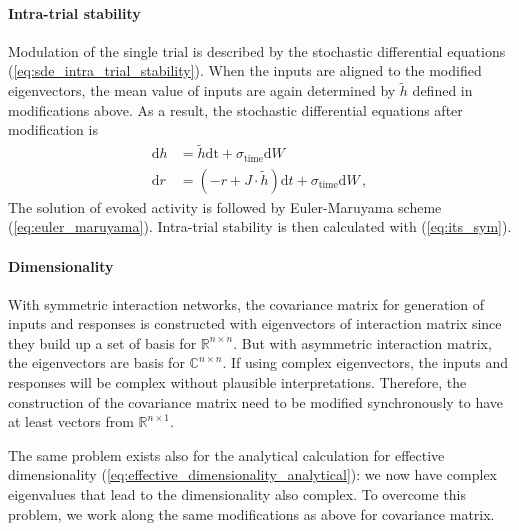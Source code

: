 \documentclass[11pt]{article}
\begin{document}
	\paragraph{Intra-trial stability} Modulation of the single trial is described by the stochastic differential equations (\ref{eq:sde_intra_trial_stability}). When the inputs are aligned to the modified eigenvectors, the mean value of inputs are again determined by $\tilde{h}$ defined in modifications above. As a result, the stochastic differential equations after modification is 
		\begin{subequations}
			\begin{align}
				\mathrm{d} h & = \tilde{h} \mathrm{dt} + \sigma_{\text{time}} \mathrm{d} W \\
				\mathrm{d} r & = (-r + J \cdot \tilde{h}) \mathrm{d}t + \sigma_{\text{time}} \mathrm{d} W \, ,
			\end{align}
		\end{subequations}
	The solution of evoked activity is followed by Euler-Maruyama scheme (\ref{eq:euler_maruyama}). Intra-trial stability is then calculated with (\ref{eq:its_sym}). 
	
	\paragraph{Dimensionality}%
	With symmetric interaction networks, the covariance matrix for generation of inputs and responses is constructed with eigenvectors of interaction matrix since they build up a set of basis for $\mathbb{R}^{n \times n}$. But with asymmetric interaction matrix, the eigenvectors are basis for $\mathbb{C}^{n \times n}$. If using complex eigenvectors, the inputs and responses will be complex without plausible interpretations. Therefore, the construction of the covariance matrix need to be modified synchronously to have at least vectors from $\mathbb{R}^{n \times 1}$. 
				  
	The same problem exists also for the analytical calculation for effective dimensionality (\ref{eq:effective_dimensionality_analytical}): we now have complex eigenvalues that lead to the dimensionality also complex. To overcome this problem, we work along the same modifications as above for covariance matrix.
				  
\end{document}

